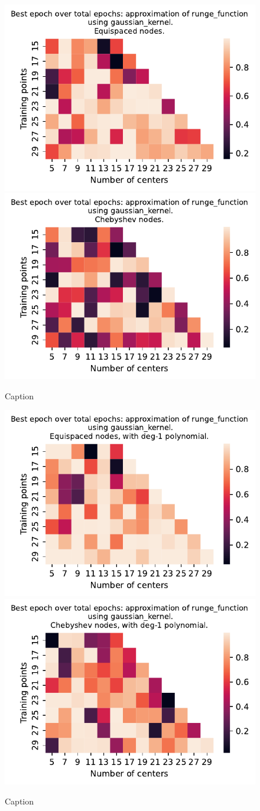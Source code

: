 \documentclass[12pt]{report} %
\begin{document}
\begin{figure}[ht]
    \centering
    
    \includegraphics[width=.49\textwidth]{imagenes/experiments/1d/variational_epochs/runge_function-Kgaussian_kernel-Equi-epochs.pdf}
    \includegraphics[width=.49\textwidth]{imagenes/experiments/1d/variational_epochs/runge_function-Kgaussian_kernel-Cheb-epochs.pdf}
    \caption{Caption}
    \label{fig:epochs-runge-gaussian}
\end{figure}


\begin{figure}[ht]
    \centering
    
    \includegraphics[width=.49\textwidth]{imagenes/experiments/1d/variational_epochs/runge_function-Kgaussian_kernel-Poly-Equi-epochs.pdf}
    \includegraphics[width=.49\textwidth]{imagenes/experiments/1d/variational_epochs/runge_function-Kgaussian_kernel-Poly-Cheb-epochs.pdf}
    \caption{Caption}
    \label{fig:epochs-runge-gaussian-poly}
\end{figure}
\end{document}
